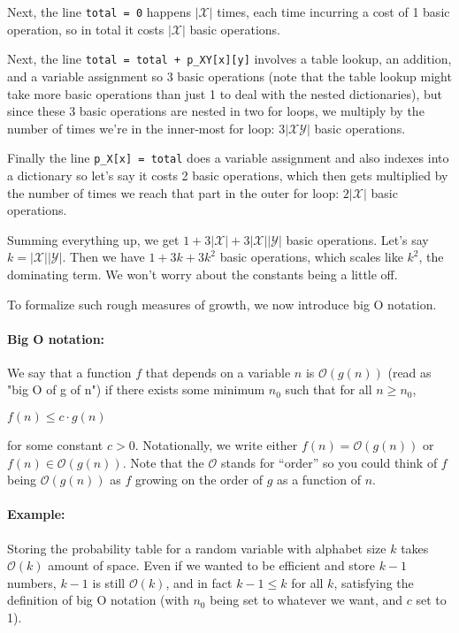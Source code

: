 \documentclass[6008notes.tex]{subfiles}
\begin{document}
Next, the line \lstinline{total = 0} happens $|\mathcal{X}|$ times, each time incurring a cost of 1 basic operation, so in total it costs $|\mathcal{X}|$ basic operations.

Next, the line \lstinline{total = total + p_XY[x][y]} involves a table lookup, an addition, and a variable assignment so 3 basic operations (note that the table lookup might take more basic operations than just 1 to deal with the nested dictionaries), but since these 3 basic operations are nested in two for loops, we multiply by the number of times we're in the inner-most for loop: $3|\mathcal{X}\mathcal{Y}|$ basic operations.

Finally the line \lstinline{p_X[x] = total} does a variable assignment and also indexes into a dictionary so let's say it costs 2 basic operations, which then gets multiplied by the number of times we reach that part in the outer for loop: $2|\mathcal{X}|$ basic operations.

Summing everything up, we get $1 + 3|\mathcal{X}|+3|\mathcal{X}||\mathcal{Y}|$ basic operations. Let's say $k=|\mathcal{X}||\mathcal{Y}|$. Then we have $1+3k+3k^2$ basic operations, which scales like $k^2$, the dominating term. We won't worry about the constants being a little off.

To formalize such rough measures of growth, we now introduce big O notation.

\paragraph{Big O notation:} We say that a function $f$ that depends on a variable $n$ is $\mathcal{O}(g(n))$ (read as "big O of g of n") if there exists some minimum $n_0$ such that for all $n \ge n_0$,
{\centering$f(n) \le c \cdot g(n)$ \par}
for some constant $c>0$. Notationally, we write either $f(n) = \mathcal{O}(g(n))$ or $f(n) \in \mathcal{O}(g(n))$. Note that the $\mathcal{O}$ stands for ``order'' so you could think of $f$ being $\mathcal{O}(g(n))$ as $f$ growing on the order of $g$ as a function of $n$.

\paragraph{Example:} Storing the probability table for a random variable with alphabet size $k$ takes $\mathcal{O}(k)$ amount of space. Even if we wanted to be efficient and store $k-1$ numbers, $k-1$ is still $\mathcal{O}(k)$, and in fact $k-1 \le k$ for all $k$, satisfying the definition of big O notation (with $n_0$ being set to whatever we want, and $c$ set to 1).
\end{document}
